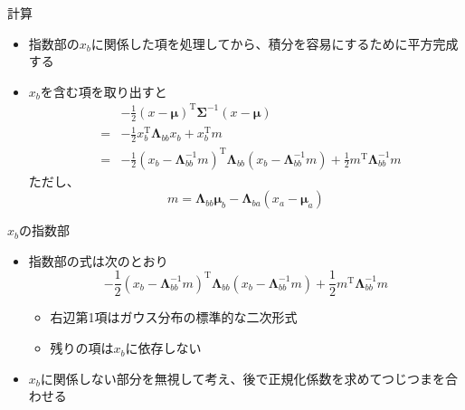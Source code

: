 \begin{frame}{計算}
 \begin{itemize}
  \item 指数部の$x_b$に関係した項を処理してから、積分を容易にするために平方完成する
  \item $x_b$を含む項を取り出すと
        \begin{eqnarray*}
         && -\frac{1}{2}(x - \bm{\mu})^{\mathrm{T}}\bm{\Sigma}^{-1}(x-\bm{\mu}) \\
         &=&-\frac{1}{2}x^{\mathrm{T}}_b\bm{\Lambda}_{bb}x_b+x^{\mathrm{T}}_bm \\
         &=& -\frac{1}{2}(x_b-\bm{\Lambda}_{bb}^{-1}m)^{\mathrm{T}}\bm{\Lambda}_{bb}(x_b-\bm{\Lambda}_{bb}^{-1}m) + \frac{1}{2}m^{\mathrm{T}}\bm{\Lambda}_{bb}^{-1}m
        \end{eqnarray*}
        ただし、
        \begin{equation*}
         m =  \bm{\Lambda}_{bb}\bm{\mu}_b - \bm{\Lambda}_{ba}(x_a-\bm{\mu}_a)
        \end{equation*}
 \end{itemize}
\end{frame}

\begin{frame}{$x_b$の指数部}
 \begin{itemize}
  \item 指数部の式は次のとおり
        \begin{equation}
         -\frac{1}{2}(x_b-\bm{\Lambda}_{bb}^{-1}m)^{\mathrm{T}}\bm{\Lambda}_{bb}(x_b-\bm{\Lambda}_{bb}^{-1}m) + \frac{1}{2}m^{\mathrm{T}}\bm{\Lambda}_{bb}^{-1}m
        \end{equation}
        \begin{itemize}
         \item 右辺第1項はガウス分布の標準的な二次形式
         \item 残りの項は$x_b$に依存しない
        \end{itemize}
  \item $x_b$に関係しない部分を無視して考え、後で正規化係数を求めてつじつまを合わせる
 \end{itemize}
\end{frame}


